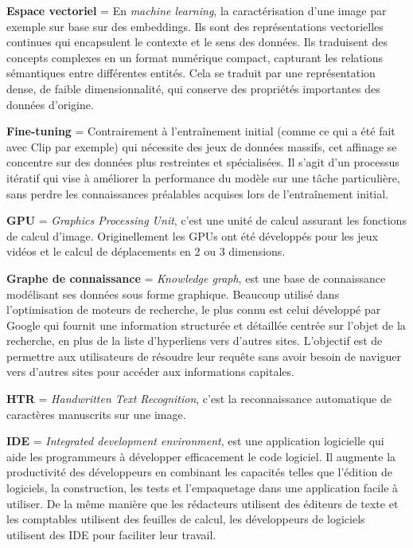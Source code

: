 \textbf{Espace vectoriel} = En \textit{machine learning}, la caractérisation d'une image par exemple sur base sur des embeddings. Ils sont des représentations vectorielles continues qui encapsulent le contexte et le sens des données. Ils traduisent des concepts complexes en un format numérique compact, capturant les relations sémantiques entre différentes entités. Cela se traduit par une représentation dense, de faible dimensionnalité, qui conserve des propriétés importantes des données d'origine.

\textbf{Fine-tuning} = Contrairement à l’entraînement initial (comme ce qui a été fait avec Clip par exemple) qui nécessite des jeux de données massifs, cet affinage se concentre sur des données plus restreintes et spécialisées. Il s’agit d’un processus itératif qui vise à améliorer la performance du modèle sur une tâche particulière, sans perdre les connaissances préalables acquises lors de l’entraînement initial.

\textbf{GPU} = \textit{Graphics Processing Unit}, c'est une unité de calcul assurant les fonctions de calcul d’image. Originellement les GPUs ont été développés pour les jeux vidéos et le calcul de déplacements en 2 ou 3 dimensions.

\textbf{Graphe de connaissance} = \textit{Knowledge graph}, est une base de connaissance modélisant ses données sous forme graphique. Beaucoup utilisé dans l'optimisation de moteurs de recherche, le plus connu est celui développé par Google qui fournit une information structurée et détaillée centrée sur l'objet de la recherche, en plus de la liste d'hyperliens vers d'autres sites. L'objectif est de permettre aux utilisateurs de résoudre leur requête sans avoir besoin de naviguer vers d'autres sites pour accéder aux informations capitales.

\textbf{HTR} = \textit{Handwritten Text Recognition}, c'est la reconnaissance automatique de caractères manuscrits sur une image.

\textbf{IDE} = \textit{Integrated development environment}, est une application logicielle qui aide les programmeurs à développer efficacement le code logiciel. Il augmente la productivité des développeurs en combinant les capacités telles que l'édition de logiciels, la construction, les tests et l'empaquetage dans une application facile à utiliser. De la même manière que les rédacteurs utilisent des éditeurs de texte et les comptables utilisent des feuilles de calcul, les développeurs de logiciels utilisent des IDE pour faciliter leur travail.

